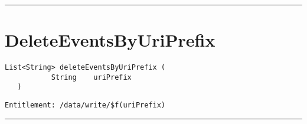 \rule{12cm}{2pt}
\section{DeleteEventsByUriPrefix}
\label{Api:DeleteEventsByUriPrefix}
\begin{lstlisting}[style=nonumbers]
   List<String> deleteEventsByUriPrefix (
           String    uriPrefix
   )
\end{lstlisting}
\begin{Verbatim}[formatcom=\color{Maroon}]
  Entitlement: /data/write/$f(uriPrefix)
\end{Verbatim}



\rule{12cm}{2pt}
